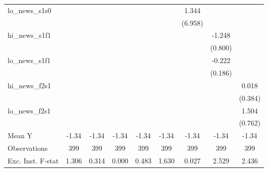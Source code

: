 {\begin{tabular}{l*{8}{c}}
\addlinespace
lo\_news\_s1s0&                     &                     &                     &                     &                     &       1.344         &                     &                     \\
            &                     &                     &                     &                     &                     &     (6.958)         &                     &                     \\
\addlinespace
hi\_news\_s1f1&                     &                     &                     &                     &                     &                     &      -1.248         &                     \\
            &                     &                     &                     &                     &                     &                     &     (0.800)         &                     \\
\addlinespace
lo\_news\_s1f1&                     &                     &                     &                     &                     &                     &      -0.222         &                     \\
            &                     &                     &                     &                     &                     &                     &     (0.186)         &                     \\
\addlinespace
hi\_news\_f2s1&                     &                     &                     &                     &                     &                     &                     &       0.018         \\
            &                     &                     &                     &                     &                     &                     &                     &     (0.384)         \\
\addlinespace
lo\_news\_f2s1&                     &                     &                     &                     &                     &                     &                     &       1.504\sym{**} \\
            &                     &                     &                     &                     &                     &                     &                     &     (0.762)         \\
\midrule
Mean Y      &       -1.34         &       -1.34         &       -1.34         &       -1.34         &       -1.34         &       -1.34         &       -1.34         &       -1.34         \\
Observations&         399         &         399         &         399         &         399         &         399         &         399         &         399         &         399         \\
Exc. Inst. F-stat&       1.306         &       0.314         &       0.000         &       0.483         &       1.630         &       0.027         &       2.529         &       2.436         \\
\bottomrule
\end{tabular}
}
